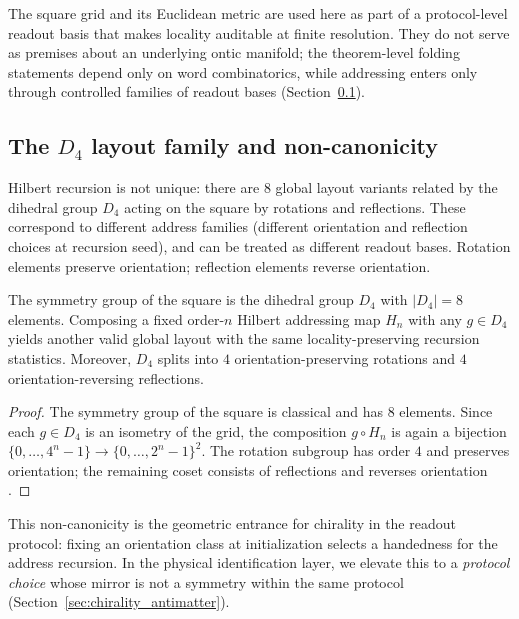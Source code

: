 \begin{remark}\label{rem:addressing_not_ontic_dimension}
The square grid and its Euclidean metric are used here as part of a protocol-level readout basis that makes locality auditable at finite resolution.
They do not serve as premises about an underlying ontic manifold; the theorem-level folding statements depend only on word combinatorics, while addressing enters only through controlled families of readout bases (Section~\ref{subsec:d4_family}).
\end{remark}

\subsection{The \texorpdfstring{$D_4$}{D4} layout family and non-canonicity}
\label{subsec:d4_family}

Hilbert recursion is not unique: there are $8$ global layout variants related by the dihedral group $D_4$ acting on the square by rotations and reflections.
These correspond to different address families (different orientation and reflection choices at recursion seed), and can be treated as different readout bases.
Rotation elements preserve orientation; reflection elements reverse orientation.

\begin{lemma}\label{lem:d4_layouts}
The symmetry group of the square is the dihedral group $D_4$ with $|D_4|=8$ elements.
Composing a fixed order-$n$ Hilbert addressing map $H_n$ with any $g\in D_4$ yields another valid global layout with the same locality-preserving recursion statistics.
Moreover, $D_4$ splits into $4$ orientation-preserving rotations and $4$ orientation-reversing reflections.
\end{lemma}
\begin{proof}
The symmetry group of the square is classical and has $8$ elements.
Since each $g\in D_4$ is an isometry of the grid, the composition $g\circ H_n$ is again a bijection $\{0,\dots,4^n-1\}\to\{0,\dots,2^n-1\}^2$.
The rotation subgroup has order $4$ and preserves orientation; the remaining coset consists of reflections and reverses orientation \cite{Sagan1994}.
\end{proof}

This non-canonicity is the geometric entrance for chirality in the readout protocol:
fixing an orientation class at initialization selects a handedness for the address recursion.
In the physical identification layer, we elevate this to a \emph{protocol choice} whose mirror is not a symmetry within the same protocol (Section~\ref{sec:chirality_antimatter}).


